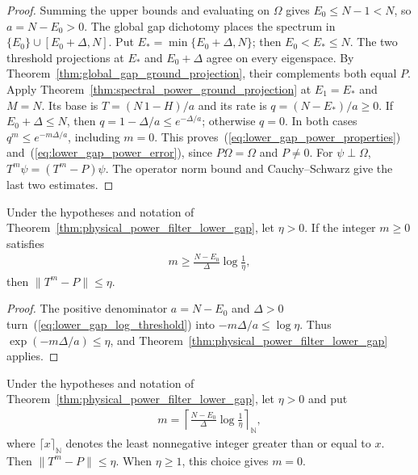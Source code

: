 \begin{proof}
    \leanok
    Summing the upper bounds and evaluating on $\Omega$ gives
    $E_0\le N-1<N$, so $a=N-E_0>0$.
    The global gap dichotomy places the spectrum in
    $\{E_0\}\cup[E_0+\Delta,N]$. Put
    $E_*=\min\{E_0+\Delta,N\}$; then $E_0<E_*\le N$.
    The two threshold projections at $E_*$ and $E_0+\Delta$
    agree on every eigenspace. By
    Theorem~\ref{thm:global_gap_ground_projection}, their complements
    both equal $P$.
    Apply Theorem~\ref{thm:spectral_power_ground_projection} at
    $E_1=E_*$ and $M=N$. Its base is $T=(N\,1-H)/a$ and its rate is
    $q=(N-E_*)/a\ge0$. If $E_0+\Delta\le N$, then
    $q=1-\Delta/a\le e^{-\Delta/a}$; otherwise $q=0$.
    In both cases $q^m\le e^{-m\Delta/a}$, including $m=0$.
    This proves~(\ref{eq:lower_gap_power_properties})
    and~(\ref{eq:lower_gap_power_error}), since $P\Omega=\Omega$
    and $P\ne0$.
    For $\psi\perp\Omega$, $T^m\psi=(T^m-P)\psi$.
    The operator norm bound and Cauchy--Schwarz give the last two estimates.
\end{proof}

\begin{theorem}
    \label{thm:physical_power_filter_lower_gap_accuracy}
    \leanok
    Under the hypotheses and notation of
    Theorem~\ref{thm:physical_power_filter_lower_gap}, let $\eta>0$.
    If the integer $m\ge0$ satisfies
    \begin{align}
        m\ge\frac{N-E_0}{\Delta}\log\frac1\eta,
        \label{eq:lower_gap_log_threshold}
    \end{align}
    then $\|T^m-P\|\le\eta$.
\end{theorem}

\begin{proof}
    \leanok
    The positive denominator $a=N-E_0$ and $\Delta>0$
    turn~(\ref{eq:lower_gap_log_threshold}) into
    $-m\Delta/a\le\log\eta$. Thus
    $\exp(-m\Delta/a)\le\eta$, and
    Theorem~\ref{thm:physical_power_filter_lower_gap} applies.
\end{proof}

\begin{theorem}
    \label{thm:physical_power_filter_lower_gap_ceil}
    \leanok
    Under the hypotheses and notation of
    Theorem~\ref{thm:physical_power_filter_lower_gap}, let $\eta>0$ and put
    \begin{align}
        m=\left\lceil\frac{N-E_0}{\Delta}\log\frac1\eta
          \right\rceil_{\mathbb N},
    \end{align}
    where $\lceil x\rceil_{\mathbb N}$ denotes the least nonnegative
    integer greater than or equal to $x$. Then $\|T^m-P\|\le\eta$.
    When $\eta\ge1$, this choice gives $m=0$.
\end{theorem}

